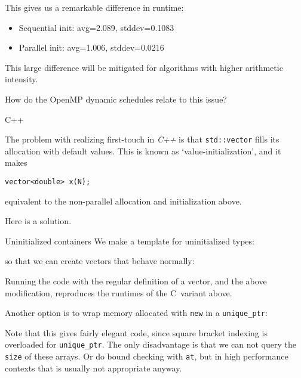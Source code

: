 This gives us a remarkable difference in runtime:
\begin{itemize}
\item
  Sequential init: avg=2.089, stddev=0.1083
\item
  Parallel init: avg=1.006, stddev=0.0216
\end{itemize}
This large difference will be mitigated
for algorithms with higher arithmetic intensity.

\begin{exercise}
  How do the OpenMP dynamic schedules relate to this issue?
\end{exercise}

 {C++}

\lstset{language=C++}

The problem with realizing first-touch in \emph{C++}%
%
is that \lstinline+std::vector+ fills its allocation with default values.
This is known as `value-initialization', and it makes
\begin{lstlisting}
vector<double> x(N);
\end{lstlisting}
equivalent to the non-parallel allocation and initialization above.

Here is a solution.
\begin{cppnote}{Uninitialized containers}
  \label{cpp:uninitial}
  We make a template for uninitialized types:

  so that we can create vectors that behave normally:
\end{cppnote}

Running the code with the regular definition of a vector,
and the above modification,
reproduces the runtimes of the C~variant above.

Another option is to wrap memory allocated with \lstinline{new}
in a \lstinline+unique_ptr+:
%

Note that this gives fairly elegant code,
since square bracket indexing is overloaded for \lstinline+unique_ptr+.
The only disadvantage is that we can not query the \lstinline{size}
of these arrays. Or do bound checking with \lstinline{at},
but in high performance contexts that is usually not appropriate anyway.

\lstset{language=C}

